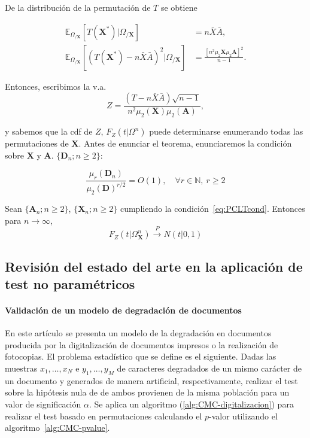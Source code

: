 	De la distribución de la permutación de $T$ se obtiene

\begin{align*}
	\mathbb{E}_{\Omega_{/\mathbf{X}}} \left[
		T(\mathbf{X}^*) | \Omega_{/\mathbf{X}}
		\right] &=
		n \bar{X} \bar{A}, \\
	\mathbb{E}_{\Omega_{/\mathbf{X}}} \left[
		(T(\mathbf{X}^*) - n\bar{X}\bar{A})^2 | 
			\Omega_{/\mathbf{X}}
		\right] &=
		\frac{[n^2 \mu_2{\mathbf{X}} \mu_2{\mathbf{A}}]^2}
			{n-1}.
\end{align*}

	Entonces, escribimos la v.a.
	\[
		Z = \frac{(T - n \bar{X} \bar{A})\sqrt{n-1}}
				{n^2 \mu_2(\mathbf{X}) \mu_2(\mathbf{A})},
	\]
	
	y sabemos que la cdf de $Z$, $F_Z(t|\Omega^n)$ puede 
determinarse enumerando todas las permutaciones de 
$\mathbf{X}$. Antes de enunciar el teorema, enunciaremos la 
condición sobre $\mathbf{X}$ y $\mathbf{A}$. 
$\{ \mathbf{D}_n; n \geq 2 \}$:

\begin{equation}
	 \label{eq:PCLTcond}
	 \tag{C.1}
	 \frac{\mu_r(\mathbf{D}_n)}
	 		{\mu_2(\mathbf{D})^{r/2}} = O(1),\quad
	 		\forall r \in \mathbb{N},\ r \geq 2
\end{equation}

\begin{teorema}
	Sean $\{\mathbf{A}_n; n \geq 2\}$, $\{\mathbf{X}_n; 
n \geq 2\}$ cumpliendo la condición~\ref{eq:PCLTcond}. 
Entonces para $n \rightarrow \infty$,
	\[ F_Z(t | \Omega^n_{\mathbf{X}}) 
		\overset{P}{\rightarrow} \mathit{N}(t | 0,1)
	\]
	\label{th:PCTL}
\end{teorema}

\subsection{Revisión del estado del arte en la aplicación de test no paramétricos}
 
\paragraph{Validación de un modelo de degradación de 
documentos} \cite{KANUNGO00} En este artículo se presenta un 
modelo de la degradación en documentos producida por la 
digitalización de documentos impresos o la realización de 
fotocopias. El problema estadístico que se define es el 
siguiente. Dadas las muestras $x_1, \dots, x_N$ e $y_1, 
\dots, y_M$ de caracteres degradados de un mismo carácter de 
un documento y generados de manera artificial, 
respectivamente, realizar el test sobre la hipótesis nula de 
de ambos  provienen de la misma población para un valor de 
significación $\alpha$. Se aplica un algoritmo 
(\ref{alg:CMC-digitalizacion}) para realizar el test basado 
en permutaciones calculando el $p$-valor utilizando el 
algoritmo~\ref{alg:CMC-pvalue}.

